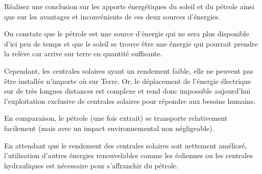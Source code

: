 \documentclass[10pt,fleqn]{article} %
\begin{document}
\begin{exercise}
\begin{solution}
    \end{solution}
    \begin{question}
        Réalisez une conclusion sur les apports énergétiques du soleil et du pétrole ainsi que sur les avantages et inconvénients de ces deux sources d’énergies. 
    \end{question}
    \begin{solution}
        On constate que le pétrole est une source d’énergie qui ne sera plus disponible d’ici peu de temps et que le soleil se trouve être une énergie qui pourrait prendre la relève car arrive sur terre en quantité suffisante.  
        
        Cependant, les centrales solaires ayant un rendement faible, elle ne peuvent pas être installée n'importe où sur Terre. Or, le déplacement de l'énergie électrique sur de très longues distances est complexe et rend donc impossible aujourd'hui l'exploitation exclusive de centrales solaires pour répondre aux besoins humains. 
        
        En comparaison, le pétrole (une fois extrait) se transporte relativement facilement (mais avec un impact environnemental non négligeable).
        
        En attendant que le rendement des centrales solaires soit nettement amélioré, l'utilisation d'autres énergies renouvelables comme les éoliennes ou les centrales hydrauliques est nécessaire pour s'affranchir du pétrole. 
    \end{solution}
\end{exercise}
\end{document}

